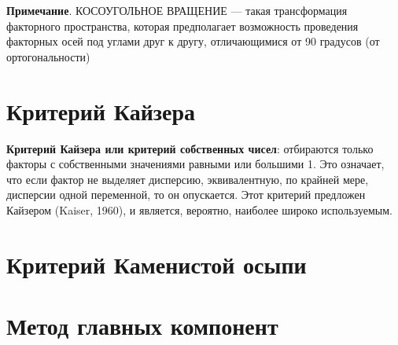 \documentclass[a4paper, 12pt]{article}
\begin{document}
\textbf{Примечание}. КОСОУГОЛЬНОЕ ВРАЩЕНИЕ --- такая трансформация факторного пространства, которая предполагает возможность проведения факторных осей под углами друг к другу, отличающимися от 90 градусов (от ортогональности)

\section{Критерий Кайзера}
\textbf{Критерий Кайзера или критерий собственных чисел}: отбираются только факторы с собственными значениями равными или большими 1. Это означает, что если фактор не выделяет дисперсию, эквивалентную, по крайней мере, дисперсии одной переменной, то он опускается. Этот критерий предложен Кайзером (Kaiser, 1960), и является, вероятно, наиболее широко используемым.
\section{Критерий Каменистой осыпи}
\section{Метод главных компонент}
\end{document}
